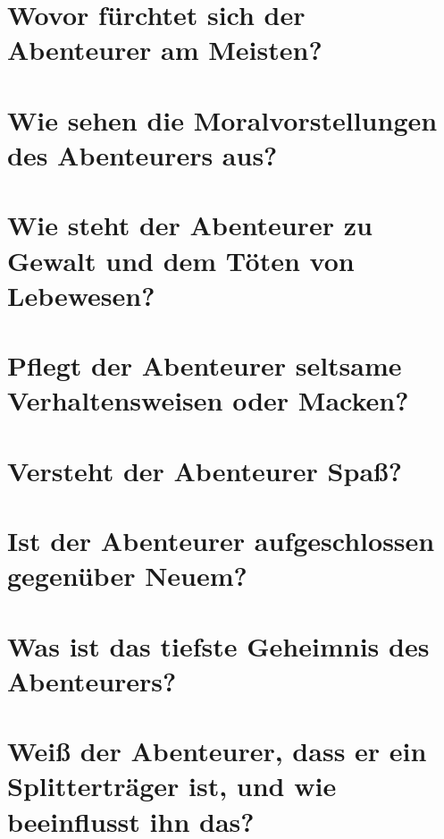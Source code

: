 \documentclass{article}
\begin{document}
	\section[Ängste]{Wovor fürchtet sich der Abenteurer am Meisten?}

	\section[Moral]{Wie sehen die Moralvorstellungen des Abenteurers aus?}
	
	\section[Frustrationstoleranz]{Wie steht der Abenteurer zu Gewalt und dem Töten von Lebewesen?}

	\section[Macken]{Pflegt der Abenteurer seltsame Verhaltensweisen oder Macken?}
	
	\section[Humor]{Versteht der Abenteurer Spaß?}
	
	\section[Aufgeschlossenheit]{Ist der Abenteurer aufgeschlossen gegenüber Neuem?}
	
	\section[Top Secret]{Was ist das tiefste Geheimnis des Abenteurers?}
	
	\section[Splitter]{Weiß der Abenteurer, dass er ein Splitterträger ist, und wie beeinflusst ihn das?}
\end{document}
